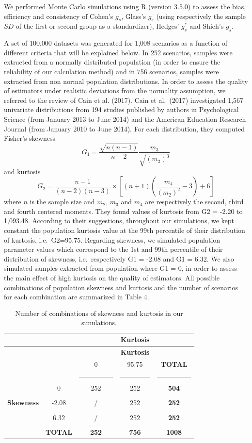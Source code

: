 \documentclass[
  english,
  man,floatsintext]{apa6}
\begin{document}
We performed Monte Carlo simulations using R (version 3.5.0) to assess the bias, efficiency and consistency of Cohen's \(g_s\), Glass's \(g_s\) (using respectively the sample \(SD\) of the first or second group as a standardizer), Hedges' \(g^*_s\) and Shieh's \(g_s\).

A set of 100,000 datasets was generated for 1,008 scenarios as a function of different criteria that will be explained below. In 252 scenarios, samples were extracted from a normally distributed population (in order to ensure the reliability of our calculation method) and in 756 scenarios, samples were extracted from non normal population distributions. In order to assess the quality of estimators under realistic deviations from the normality assumption, we referred to the review of Cain et al. (2017). Cain et al.~(2017) investigated 1,567 univariate distributions from 194 studies published by authors in Psychological Science (from January 2013 to June 2014) and the American Education Research Journal (from January 2010 to June 2014). For each distribution, they computed Fisher's skewness
\[G_{1}=\frac{\sqrt{n(n-1)}}{n-2} \frac{m_{3}}{\sqrt{(m_{2})^3}}\]
and kurtosis \[G_{2}=\frac{n-1}{(n-2)(n-3)}\times \left[(n+1)\left(\frac{m_{4}}{(m_{2})^2}-3\right)+6\right]\]
where \(n\) is the sample size and \(m_{2}\), \(m_{3}\) and \(m_{4}\) are respectively the second, third and fourth centered moments. They found values of kurtosis from G2 = -2.20 to 1,093.48. According to their suggestions, throughout our simulations, we kept constant the population kurtosis value at the 99th percentile of their distribution of kurtosis, i.e.~G2=95.75. Regarding skewness, we simulated population parameter values which correspond to the 1st and 99th percentile of their distribution of skewness, i.e.~respectively G1 = -2.08 and G1 = 6.32. We also simulated samples extracted from population where G1 = 0, in order to assess the main effect of high kurtosis on the quality of estimators. All possible combinations of population skewness and kurtosis and the number of scenarios for each combination are summarized in Table 4.

\begin{longtable}[]{@{}ccccc@{}}
\caption{Number of combinations of skewness and kurtosis in our simulations.}\tabularnewline
\toprule
& & & \textbf{Kurtosis} &\tabularnewline
\midrule
\endfirsthead
\toprule
& & & \textbf{Kurtosis} &\tabularnewline
\midrule
\endhead
& & 0 & 95.75 & \textbf{TOTAL}\tabularnewline
& & --------------- & -------------- & ---------------\tabularnewline
& 0 & 252 & 252 & \textbf{504}\tabularnewline
& & & &\tabularnewline
\textbf{Skewness} & -2.08 & / & 252 & \textbf{252}\tabularnewline
& & & &\tabularnewline
& 6.32 & / & 252 & \textbf{252}\tabularnewline
& & & &\tabularnewline
& \textbf{TOTAL} & \textbf{252} & \textbf{756} & \textbf{1008}\tabularnewline
\bottomrule
\end{longtable}
\end{document}
